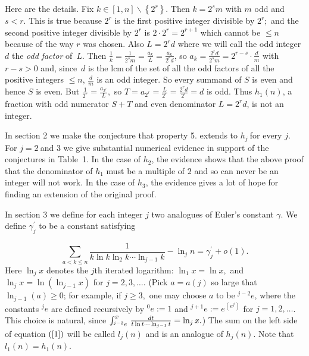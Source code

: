 \documentclass{article}
\theoremstyle{theorem}
\theoremstyle{definition}
\begin{document}
Here are the details. Fix $k\in \left[ 1,n\right] \backslash \left\{
2^{r}\right\} $. Then $k=2^{s}m$ with $m$ odd and $%
s<r. $ This is true because $2^{r}$ is the first positive integer divisible
by $2^{r};$ and the second positive integer divisible by $2^{r}$ is $2\cdot
2^{r}=2^{r+1}$ which cannot be $\leq n$ because of the way $r$ was chosen.
Also $L=2^{r}d$ where we will call the odd integer $d$ the \textit{odd factor%
} of~$L.$ Then $\frac{1}{k}=\frac{1}{2^{s}m}=\frac{a_{k}}{L}=%
\frac{a_{k}}{2^{r}d}$, so $a_{k}=\frac{2^{r}d}{2^{s}m}%
=2^{r-s}\cdot \frac{d}{m}$ with $r-s>0$ and, since~$d$ is the $%
\mbox{lcm}\ $of the set of all the odd factors of all the positive integers $%
\leq n$, $\frac{d}{m}$ is an odd integer. So every summand of $S$
is even and hence $S$ is even. But $\frac{1}{2^{r}}=\frac{a_{2^{r}}}{L},$ so 
$T=a_{2^{r}}=\frac{L}{2^{r}}=\frac{2^{r}d}{2^{r}}=d$ is odd. Thus $%
h_{1}\left( n\right) $, a fraction with odd numerator $S+T$ and even
denominator $L=2^{r}d$, is not an integer.

In section 2 we make the conjecture that property 5. extends to $h_{j}\ $for
every $j$. For $j=2\ $and $3$ we give substantial numerical evidence in
support of the conjectures in Table~1. In the case of $h_{2}$, the evidence
shows that the above proof that the denominator of $h_{1}$ must be a
multiple of $2$ and so can never be an integer will not work. In the case of 
$h_{3}$, the evidence gives a lot of hope for finding an extension of the
original proof.

In section 3 we define for each integer $j$ two analogues of Euler's
constant $\gamma $. We define $\gamma _{j}^{\prime }$ to be a constant
satisfying

\begin{equation}
\sum_{a<k\leq n}\frac{1}{k\ln k\ln _{2}k\cdots \ln _{j-1}k}-\ln
_{j}n=\gamma _{j}^{\prime }+o\left( 1\right) .  \label{1}
\end{equation}%
Here $\ln _{j}x$ denotes the $j$th iterated logarithm: $\ln _{1}x=\ln x,$
and $\ln _{j}x=\ln (\ln _{j-1}x)$ for $j=2,3,\dots $. (Pick $a=a\left(
j\right) $ so large that $\ln _{j-1}\left( a\right) \geq 0$; for example, if 
$j\geq 3,$ one may choose $a$ to be $^{j-2}e$, where the constants $^{j}e$
are defined recursively by $^{0}e:=1$ and $^{j+1}e:=e^{(e^{j})}$ for $%
j=1,2,\dots $. This choice is natural, since $\int_{^{j-2}e}^{x}\,\frac{dt}{%
t\ln t\cdots\ln_{j-1}t}=\ln _{j}x.$) The sum on the left side of equation $%
\left( \ref{1}\right) $ will be called $l_{j}\left( n\right) $ and is an
analogue of $h_{j}\left( n\right) $. Note that $l_{1}\left( n\right)
=h_{1}\left( n\right) $.
\end{document}
